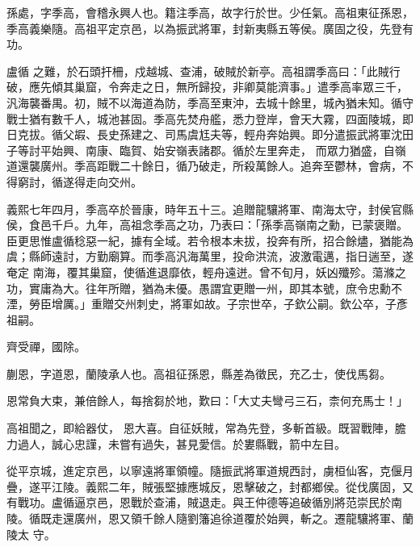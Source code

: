 
\begin{pinyinscope}

 孫處，字季高，會稽永興人也。籍注季高，故字行於世。少任氣。高祖東征孫恩，季高義樂隨。高祖平定京邑，以為振武將軍，封新夷縣五等侯。廣固之役，先登有功。



 盧循
 之難，於石頭扞柵，戍越城、查浦，破賊於新亭。高祖謂季高曰：「此賊行破，應先傾其巢窟，令奔走之日，無所歸投，非卿莫能濟事。」遣季高率眾三千，汎海襲番禺。初，賊不以海道為防，季高至東沖，去城十餘里，城內猶未知。循守戰士猶有數千人，城池甚固。季高先焚舟艦，悉力登岸，會天大霧，四面陵城，即日克拔。循父嘏、長史孫建之、司馬虞尪夫等，輕舟奔始興。即分遣振武將軍沈田子等討平始興、南康、臨賀、始安嶺表諸郡。循於左里奔走，
 而眾力猶盛，自嶺道還襲廣州。季高距戰二十餘日，循乃破走，所殺萬餘人。追奔至鬱林，會病，不得窮討，循遂得走向交州。



 義熙七年四月，季高卒於晉康，時年五十三。追贈龍驤將軍、南海太守，封侯官縣侯，食邑千戶。九年，高祖念季高之功，乃表曰：「孫季高嶺南之勳，已蒙褒贈。臣更思惟盧循稔惡一紀，據有全域。若令根本未拔，投奔有所，招合餘燼，猶能為虞；縣師遠討，方勤廟算。而季高汎海萬里，投命洪流，波激電邁，指日遄至，遂奄定
 南海，覆其巢窟，使循進退靡依，輕舟遠迸。曾不旬月，妖凶殲殄。蕩滌之功，實庸為大。往年所贈，猶為未優。愚謂宜更贈一州，即其本號，庶令忠勳不湮，勞臣增厲。」重贈交州刺史，將軍如故。子宗世卒，子欽公嗣。欽公卒，子彥祖嗣。



 齊受禪，國除。



 蒯恩，字道恩，蘭陵承人也。高祖征孫恩，縣差為徵民，充乙士，使伐馬芻。



 恩常負大束，兼倍餘人，每捨芻於地，歎曰：「大丈夫彎弓三石，柰何充馬士！」



 高祖聞之，即給器仗，
 恩大喜。自征妖賊，常為先登，多斬首級。既習戰陣，膽力過人，誠心忠謹，未嘗有過失，甚見愛信。於婁縣戰，箭中左目。



 從平京城，進定京邑，以寧遠將軍領幢。隨振武將軍道規西討，虜桓仙客，克偃月疊，遂平江陵。義熙二年，賊張堅據應城反，恩擊破之，封都鄉侯。從伐廣固，又有戰功。盧循逼京邑，恩戰於查浦，賊退走。與王仲德等追破循別將范崇民於南陵。循既走還廣州，恩又領千餘人隨劉籓追徐道覆於始興，斬之。遷龍驤將軍、蘭陵太
 守。




\end{pinyinscope}
